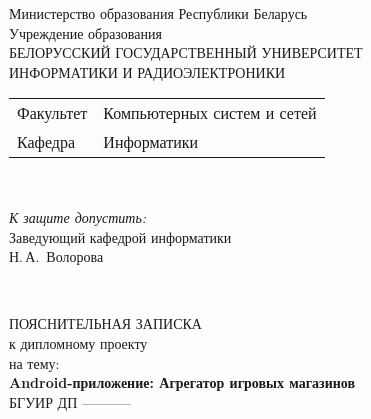 \begin{titlepage}
  \begin{center}
    Министерство образования Республики Беларусь\\[1em]
    Учреждение образования\\
    БЕЛОРУССКИЙ ГОСУДАРСТВЕННЫЙ УНИВЕРСИТЕТ \\
    ИНФОРМАТИКИ И РАДИОЭЛЕКТРОНИКИ\\[1em]

    \begin{minipage}{\textwidth}
      \begin{flushleft}
        \begin{tabular}{ l l }
          Факультет & Компьютерных систем и сетей\\
          Кафедра   & Информатики
        \end{tabular}
      \end{flushleft}
    \end{minipage}\\[1em]

    \begin{flushright}
      \begin{minipage}{0.4\textwidth}
        \textit{К защите допустить:}\\[0.8em]
        Заведующий кафедрой информатики\\[0.45em]
        \underline{\hspace*{2.8cm}} Н.\,А.~Волорова
      \end{minipage}\\[2.2em]
    \end{flushright}

    {ПОЯСНИТЕЛЬНАЯ ЗАПИСКА}\\
    {к дипломному проекту}\\
    {на тему:}\\[1em]
    \textbf{\large Android-приложение: Агрегатор игровых магазинов}\\[1em]


     {БГУИР ДП -----------}\\[2em]
    

\end{center}
\end{titlepage}
